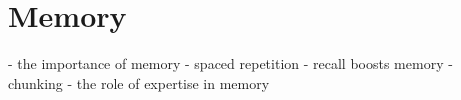 \chapter{Memory}

- the importance of memory
- spaced repetition
- recall boosts memory
- chunking
- the role of expertise in memory
